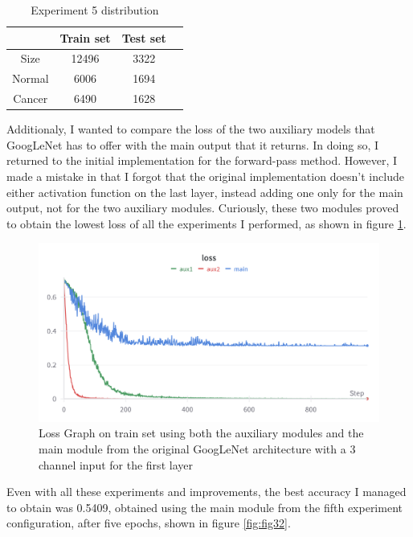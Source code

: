 \begin{table}[ht!]
\centering
\begin{tabular}{|c|c|c|c|}
    \hline
     & Train set & Test set \\ \hline
    Size & 12496 & 3322 \\ \hline
    Normal & 6006 & 1694\\ \hline
    Cancer & 6490 & 1628\\ \hline
    \end{tabular}
    \caption{Experiment 5 distribution}
    \label{tab:tab3}
\end{table}

Additionaly, I wanted to compare the loss of the two auxiliary models that GoogLeNet has to offer with the main output that it returns. In doing so, I returned to the initial implementation for the forward-pass method. However, I made a mistake in that I forgot that the original implementation doesn't include either activation function on the last layer, instead adding one only for the main output, not for the two auxiliary modules. Curiously, these two modules proved to obtain the lowest loss of all the experiments I performed, as shown in figure \ref{fig:fig18}.

\begin{figure}[H]
    \centering
    \includegraphics[width=0.75\linewidth]{figures/Figure19.png}
    \caption{Loss Graph on train set using both the auxiliary modules and the main module from the original GoogLeNet architecture with a 3 channel input for the first layer}
    \label{fig:fig18}
\end{figure}

Even with all these experiments and improvements, the best accuracy I managed to obtain was 0.5409, obtained using the main module from the fifth experiment configuration, after five epochs, shown in figure \ref{fig:fig32}.

